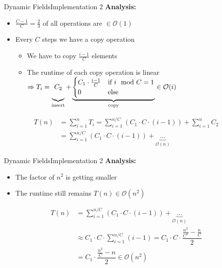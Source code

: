
\begin{frame}{Dynamic Fields}{Implementation 2}
  \textbf{Analysis:}
  \begin{itemize}
    \item
      $\frac{C - 1}{C} = \frac{2}{3}$ of all operations are $\in \mathcal{O}(1)$
    \item
      Every $C$ steps we have a copy operation
    \begin{itemize}
      \item
        We have to copy $\frac{i- 1}{C}$ elements
      \item
        The runtime of each copy operation is linear\\
        $\Rightarrow T_i =
          \underbrace{
            C_2\vphantom{\begin{cases}C_1\\0\end{cases}}
          }_\text{insert}
          + \underbrace{\begin{cases}
            C_1 \cdot \frac{i - 1}{C} & \text{if } i \mod C = 1\\
            0 & \text{else}
            \end{cases}}_\text{copy}
          \in \mathcal{O}(i)$
    \end{itemize}
  \end{itemize}
  \begin{align*}
    T(n)
      &= \sum_{i=1}^{n} T_i
      = \sum_{i=1}^{n/C} \left(C_1 \cdot C \cdot (i-1) \right)
        + \sum_{i=1}^n C_2\\
      &= \sum_{i=1}^{n/C} \left(C_1 \cdot C \cdot (i-1) \right)
        + \underbrace{\dots}_{\mathcal{O}(n)}
  \end{align*}
\end{frame}


\begin{frame}{Dynamic Fields}{Implementation 2}
  \textbf{Analysis:}
  \begin{itemize}
    \item
      The factor of $n^2$ is getting smaller
    \item
      The runtime still remains $T(n) \in \mathcal{O}(n^2)$
  \end{itemize}
  \begin{align*}%
    T(n)
      &= \sum_{i=1}^{n/C} \left(C_1 \cdot C \cdot (i-1) \right)
        + \underbrace{\dots}_{\mathcal{O}(n)}\\
    {} &\approx C_1 \cdot C \cdot \sum_{i=1}^{n/C} (i-1)
    = C_1 \cdot C \cdot \dfrac{\frac{n^2}{C^2}-\frac{n}{C}}{2}\\
    {} &= C_1 \cdot \dfrac{\frac{n^2}{C}-n}{2}
    \in \mathcal{O}(n^2)
  \end{align*}
\end{frame}

